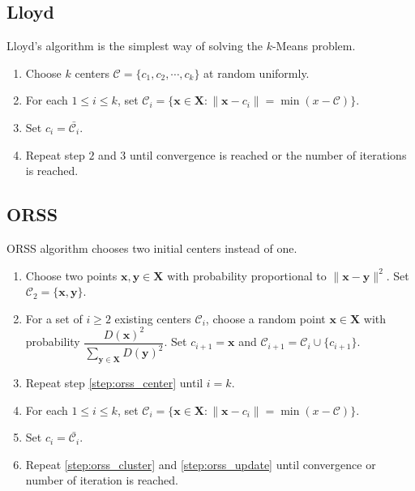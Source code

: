 \documentclass[twoside, 11pt]{article}
\newcommand{\x}{\mathbf{x}}
\newcommand{\X}{\mathbf{X}}
\newcommand{\y}{\mathbf{y}}
\newcommand{\C}{\mathcal{C}}
\begin{document}
	\subsection{Lloyd}
	Lloyd's algorithm is the simplest way of solving the $k$-Means problem.
		\begin{enumerate}[i]
			\item Choose $k$ centers $\C=\{c_1,c_2,\cdots,c_k\}$ at random uniformly.
			\item For each $1\leq i\leq k$, set $\C_i=\{\x\in\X:\|\x-c_i\|=\min(x-\C)\}$.
			\item Set $c_i=\bar{\C_i}$.
			\item Repeat step $2$ and $3$ until convergence is reached or the number of iterations is reached.
		\end{enumerate}
	\subsection{ORSS}
	ORSS algorithm \cite{ostrovsky} chooses two initial centers instead of one.
		\begin{enumerate}[i]
			\item Choose two points $\x,\y\in\X$ with probability proportional to $\|\x-\y\|^2$. Set $\C_2=\{\x,\y\}$.
			\item For a set of $i\geq2$ existing centers $\C_i$, choose a random point $\x\in\X$ with probability $\dfrac{D(\x)^2}{\sum_{\y\in\X}D(\y)^2}$. Set $c_{i+1}=\x$ and $\C_{i+1}=\C_i\cup\{c_{i+1}\}$.\label{step:orss_center}
			\item Repeat step \eqref{step:orss_center} until $i=k$.
			\item For each $1\leq i\leq k$, set $\C_i=\{\x\in\X:\|\x-c_i\|=\min(x-\C)\}$.\label{step:orss_cluster}
			\item Set $c_i=\bar{\C_i}$.\label{step:orss_update}
			\item Repeat \eqref{step:orss_cluster} and \eqref{step:orss_update} until convergence or number of iteration is reached.
		\end{enumerate}
\end{document}
